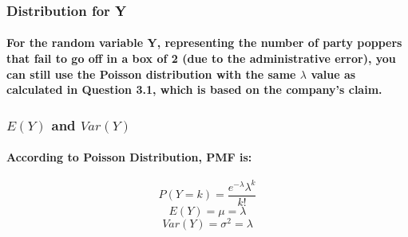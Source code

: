 \subsubsection{Distribution for Y}
\paragraph{For the random variable Y, representing the number of party poppers that fail to go off in a box of 2 (due to the administrative error), you can still use the Poisson distribution with the same $\lambda$ value as calculated in Question 3.1, which is based on the company's claim.}

\subsubsection{$E(Y)$ and $Var(Y)$}
\paragraph{According to Poisson Distribution, PMF is:}
$$ P(Y=k)=\frac{e^{- \lambda} \lambda^k}{k!} $$
$$ E(Y)= \mu = \lambda $$
$$ Var(Y) = \sigma^2 = \lambda $$